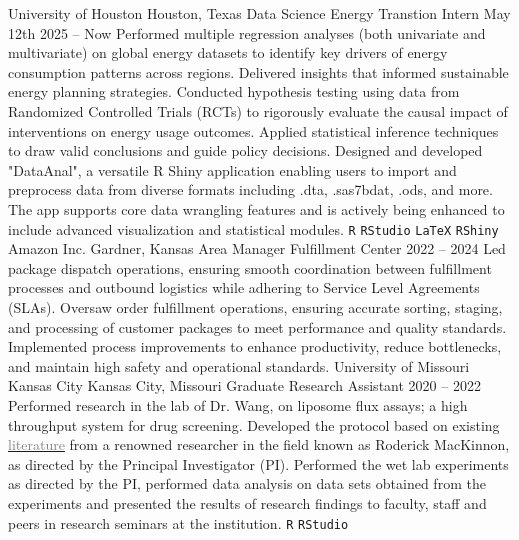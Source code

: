 \documentclass[9pt]{adeckcv} %
\begin{document}

\begin{entrylist}
    \entry
        {\large{University of Houston}} 
        {Houston, Texas}
        {\large{Data Science Energy Transtion Intern}}
        {May 12th 2025 -- Now}
        {\itemizeexperience
        {Performed multiple regression analyses (both univariate and multivariate) on global energy datasets to identify key drivers of energy consumption patterns across regions. Delivered insights that informed sustainable energy planning strategies.}
        {Conducted hypothesis testing using data from Randomized Controlled Trials (RCTs) to rigorously evaluate the causal impact of interventions on energy usage outcomes. Applied statistical inference techniques to draw valid conclusions and guide policy decisions.}
{Designed and developed "DataAnal", a versatile R Shiny application enabling users to import and preprocess data from diverse formats including .dta, .sas7bdat, .ods, and more. The app supports core data wrangling features and is actively being enhanced to include advanced visualization and statistical modules.
}
\texttt{R}\slashsep
\texttt{RStudio}\slashsep
\faMarkdown\slashsep
\texttt{LaTeX}\slashsep
\texttt{RShiny}\slashsep
\faWindows\slashsep 
\faLinux\slashsep
}
\entry
{\large{Amazon Inc.}}
{Gardner, Kansas}
{\large{Area Manager Fulfillment Center}}
{2022 -- 2024}
{\itemizeexperience
  {Led package dispatch operations, ensuring smooth coordination between fulfillment processes and outbound logistics while adhering to Service Level Agreements (SLAs).}
  {Oversaw order fulfillment operations, ensuring accurate sorting, staging, and processing of customer packages to meet performance and quality standards.}
  {Implemented process improvements to enhance productivity, reduce bottlenecks, and maintain high safety and operational standards.}
  \faAmazon\slashsep
  \faWarehouse
}
\entry
{\large{University of Missouri Kansas City}}
{Kansas City, Missouri}
{\large{Graduate Research Assistant}}
{2020 -- 2022}
{\itemizeexperience
  {Performed research in the lab of Dr. Wang, on liposome flux assays; a high throughput system for drug screening. }
  {Developed the protocol based on existing \href{https://www.pnas.org/doi/10.1073/pnas.1602815113}{\textcolor{gray}{literature}} from a renowned researcher in the field known as Roderick MacKinnon, as directed by the Principal Investigator (PI).}
  {Performed the wet lab experiments as directed by the PI, performed data analysis on data sets obtained from the experiments and presented the results of research findings to faculty, staff and peers in research seminars at the institution.}
  \texttt{R}\slashsep
  \texttt{RStudio}\slashsep
  \faDna\slashsep
  \faSlideshare
}
\end{entrylist}
\end{document}

